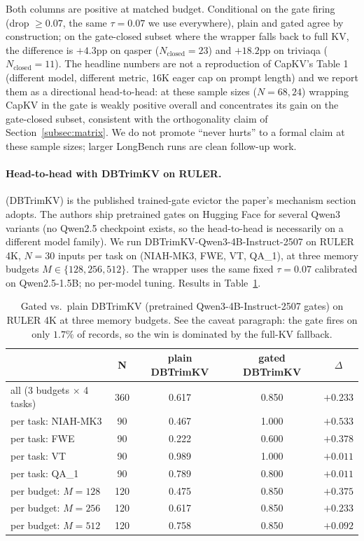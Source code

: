 \documentclass{article}
\begin{document}
Both columns are positive at matched budget. Conditional on the gate
firing (drop $\geq 0.07$, the same $\tau = 0.07$ we use everywhere),
plain and gated agree by construction; on the gate-closed subset where
the wrapper falls back to full KV, the difference is $+4.3$pp on qasper
($N_{\text{closed}} = 23$) and $+18.2$pp on triviaqa
($N_{\text{closed}} = 11$). The headline numbers are not a reproduction
of CapKV's Table 1 (different model, different metric, 16K eager cap on
prompt length) and we report them as a directional head-to-head: at
these sample sizes ($N = 68, 24$) wrapping CapKV in the gate is
weakly positive overall and concentrates its gain on the gate-closed
subset, consistent with the orthogonality claim of
Section~\ref{subsec:matrix}. We do not promote ``never hurts'' to a
formal claim at these sample sizes; larger LongBench runs are clean
follow-up work.

\paragraph{Head-to-head with DBTrimKV on RULER.}
\citet{arxiv260509649} (DBTrimKV) is the published trained-gate evictor
the paper's mechanism section adopts. The authors ship pretrained gates
on Hugging Face for several Qwen3 variants (no Qwen2.5 checkpoint
exists, so the head-to-head is necessarily on a different model
family). We run DBTrimKV-Qwen3-4B-Instruct-2507 on RULER 4K, $N = 30$
inputs per task on (NIAH-MK3, FWE, VT, QA\_1), at three memory budgets
$M \in \{128, 256, 512\}$. The wrapper uses the same fixed
$\tau = 0.07$ calibrated on Qwen2.5-1.5B; no per-model tuning.
Results in Table~\ref{tab:dbtrimkv}.

\begin{table}[h]
\centering
\caption{Gated vs.\ plain DBTrimKV (pretrained Qwen3-4B-Instruct-2507
gates) on RULER 4K at three memory budgets. See the caveat paragraph:
the gate fires on only $1.7\%$ of records, so the win is dominated by
the full-KV fallback.}
\label{tab:dbtrimkv}
\begin{tabular}{lcccc}
\toprule
 & N & plain DBTrimKV & gated DBTrimKV & $\Delta$ \\
\midrule
all (3 budgets $\times$ 4 tasks) & 360 & 0.617 & 0.850 & $\boldsymbol{+0.233}$ \\
\midrule
per task: NIAH-MK3 & 90 & 0.467 & 1.000 & $+0.533$ \\
per task: FWE      & 90 & 0.222 & 0.600 & $+0.378$ \\
per task: VT       & 90 & 0.989 & 1.000 & $+0.011$ \\
per task: QA\_1    & 90 & 0.789 & 0.800 & $+0.011$ \\
\midrule
per budget: $M=128$ & 120 & 0.475 & 0.850 & $+0.375$ \\
per budget: $M=256$ & 120 & 0.617 & 0.850 & $+0.233$ \\
per budget: $M=512$ & 120 & 0.758 & 0.850 & $+0.092$ \\
\bottomrule
\end{tabular}
\end{table}
\end{document}
